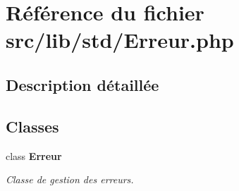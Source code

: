 \section{Référence du fichier src/lib/std/Erreur.php}
\label{_erreur_8php}


\subsection{Description détaillée}


\subsection*{Classes}
\begin{CompactItemize}
\item 
class {\bf Erreur}
\begin{CompactList}\small\item\em Classe de gestion des erreurs. \item\end{CompactList}\end{CompactItemize}

